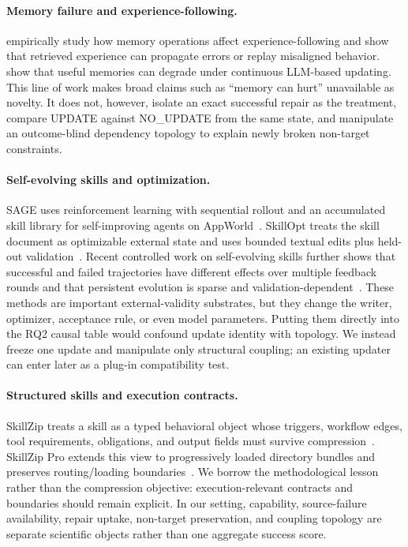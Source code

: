 \documentclass{article}
\begin{document}
\paragraph{Memory failure and experience-following.}
\citet{xiong2026memory} empirically study how memory operations affect experience-following and show that retrieved experience can propagate errors or replay misaligned behavior. \citet{zhang2026faultymemory} show that useful memories can degrade under continuous LLM-based updating. This line of work makes broad claims such as ``memory can hurt'' unavailable as novelty. It does not, however, isolate an exact successful repair as the treatment, compare UPDATE against NO\_UPDATE from the same state, and manipulate an outcome-blind dependency topology to explain newly broken non-target constraints.

\paragraph{Self-evolving skills and optimization.}
SAGE uses reinforcement learning with sequential rollout and an accumulated skill library for self-improving agents on AppWorld~\citep{wang2026sage}. SkillOpt treats the skill document as optimizable external state and uses bounded textual edits plus held-out validation~\citep{yang2026skillopt}. Recent controlled work on self-evolving skills further shows that successful and failed trajectories have different effects over multiple feedback rounds and that persistent evolution is sparse and validation-dependent~\citep{liu2026rethinking}. These methods are important external-validity substrates, but they change the writer, optimizer, acceptance rule, or even model parameters. Putting them directly into the RQ2 causal table would confound update identity with topology. We instead freeze one update and manipulate only structural coupling; an existing updater can enter later as a plug-in compatibility test.

\paragraph{Structured skills and execution contracts.}
SkillZip treats a skill as a typed behavioral object whose triggers, workflow edges, tool requirements, obligations, and output fields must survive compression~\citep{bai2026skillzip}. SkillZip Pro extends this view to progressively loaded directory bundles and preserves routing/loading boundaries~\citep{bai2026skillzippro}. We borrow the methodological lesson rather than the compression objective: execution-relevant contracts and boundaries should remain explicit. In our setting, capability, source-failure availability, repair uptake, non-target preservation, and coupling topology are separate scientific objects rather than one aggregate success score.
\end{document}
